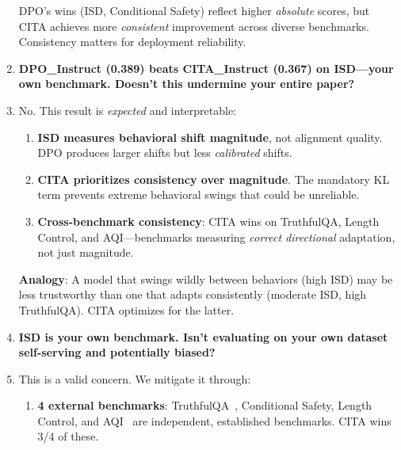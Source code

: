 \begin{enumerate}[label=\textbf{Q\arabic*.}, leftmargin=*, itemsep=8pt]
DPO's wins (ISD, Conditional Safety) reflect higher \textit{absolute} scores, but CITA achieves more \textit{consistent} improvement across diverse benchmarks. Consistency matters for deployment reliability.

\vspace{4mm}

\item[\ding{93}] \textbf{DPO\_Instruct (0.389) beats CITA\_Instruct (0.367) on ISD---your own benchmark. Doesn't this undermine your entire paper?}

\item[\ding{224}] No. This result is \textit{expected} and interpretable:

\begin{enumerate}[leftmargin=*,itemsep=2pt]
    \item \textbf{ISD measures behavioral shift magnitude}, not alignment quality. DPO produces larger shifts but less \textit{calibrated} shifts.

    \item \textbf{CITA prioritizes consistency over magnitude}. The mandatory KL term prevents extreme behavioral swings that could be unreliable.

    \item \textbf{Cross-benchmark consistency}: CITA wins on TruthfulQA, Length Control, and AQI---benchmarks measuring \textit{correct directional} adaptation, not just magnitude.
\end{enumerate}

\textbf{Analogy}: A model that swings wildly between behaviors (high ISD) may be less trustworthy than one that adapts consistently (moderate ISD, high TruthfulQA). CITA optimizes for the latter.

\vspace{4mm}

\item[\ding{93}] \textbf{ISD is your own benchmark. Isn't evaluating on your own dataset self-serving and potentially biased?}

\item[\ding{224}] This is a valid concern. We mitigate it through:

\begin{enumerate}[leftmargin=*,itemsep=2pt]
    \item \textbf{4 external benchmarks}: TruthfulQA~\cite{lin2022truthfulqa}, Conditional Safety, Length Control, and AQI~\cite{hendrycks2023aligning} are independent, established benchmarks. CITA wins 3/4 of these.


\end{enumerate}
\end{enumerate}
